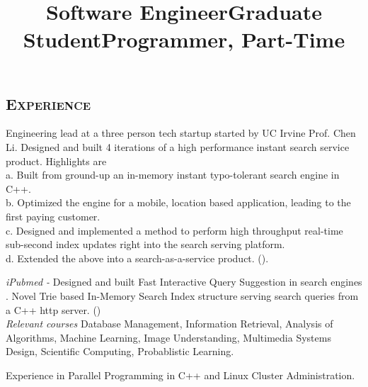 \begin{resume}
\section{\textsc{Experience}}
\title{Software Engineer}

\begin{position}
Engineering lead at a three person tech startup started by UC Irvine Prof. Chen Li. Designed and built 4 iterations of a high performance instant search service product. Highlights are\\
a. Built from ground-up an in-memory instant typo-tolerant search engine in C++.\\
b. Optimized the engine for a mobile, location based application, leading to the first paying customer.\\
c. Designed and implemented a method to perform high throughput real-time sub-second index updates right into the search serving platform.\\  
d. Extended the above into a search-as-a-service product. (). 
\end{position}

\title{Graduate Student}
\begin{position}
\textit{iPubmed -} Designed and built Fast Interactive Query Suggestion in search engines . Novel Trie based In-Memory Search Index structure serving search queries from a C++ http server. ()\\
\textit{Relevant courses}
Database Management, Information Retrieval, Analysis of Algorithms, Machine Learning, Image Understanding, Multimedia Systems Design, Scientific Computing, Probablistic Learning.
\end{position}

\title{Programmer, Part-Time}
\begin{position}
Experience in Parallel Programming in C++ and Linux Cluster Administration.
\end{position}


\end{resume}
